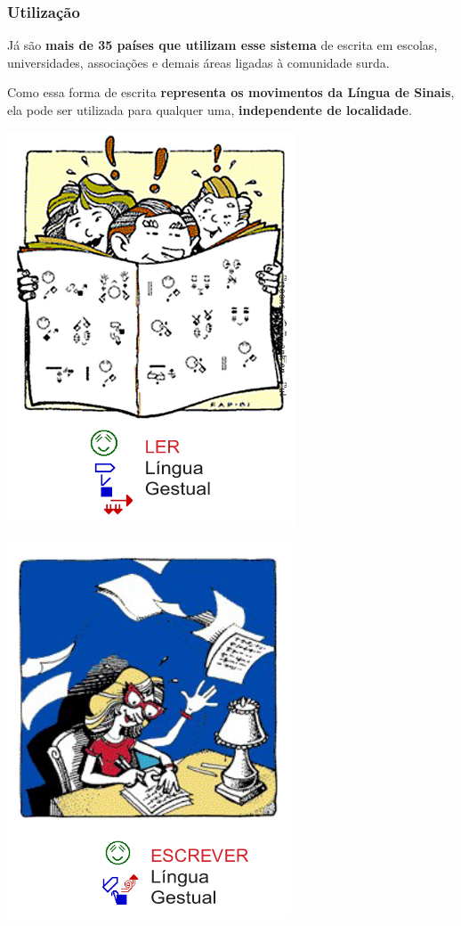 \documentclass[10pt]{beamer}
\theoremstyle{plain}
\theoremstyle{definition}
\begin{document}
	\begin{frame}
		\frametitle{Utilização}
		
		Já são \textbf{mais de 35 países que utilizam esse sistema} de escrita em escolas, universidades, associações e demais áreas ligadas à comunidade surda.
		\vspace{0.5cm}
		
		Como essa forma de escrita \textbf{representa os movimentos da Língua de Sinais}, ela pode ser utilizada para qualquer uma, \textbf{independente de localidade}.
		
		\begin{center}
			\begin{minipage}{0.3\linewidth}
				\includegraphics[scale=0.24]{figures/ler.png}
			\end{minipage}
			\begin{minipage}{0.3\linewidth}
				\includegraphics[scale=0.24]{figures/escrever.png}

\end{minipage}
\end{center}
\end{frame}
\end{document}
